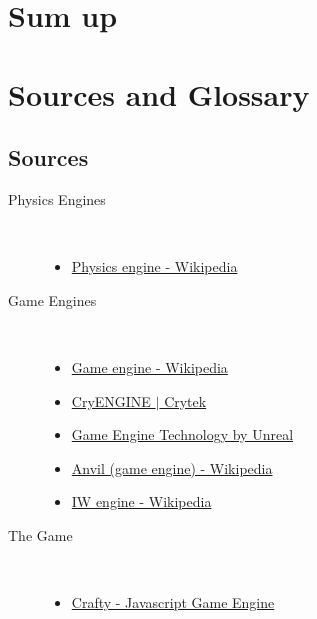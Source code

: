 \documentclass[DIV=calc, paper=a4, fontsize=11pt, twocolumn]{scrreprt}	 %
\begin{document}



        \chapter{Sum up}


        \chapter{Sources and Glossary}

        \section{Sources}
        \begin{description}
          \item[Physics Engines] \hfill \\
            \begin{itemize}
              \item \href{http://en.wikipedia.org/wiki/Physics_engine}{Physics engine - Wikipedia}
            \end{itemize}
          \item[Game Engines] \hfill \\
            \begin{itemize}
              \item \href{http://en.wikipedia.org/wiki/Game_engine}{Game engine - Wikipedia}
              \item \href{http://www.crytek.com/cryengine}{CryENGINE $|$ Crytek}
              \item \href{http://www.unrealengine.com}{Game Engine Technology by Unreal}
              \item \href{http://en.wikipedia.org/wiki/Anvil_(game_engine)}{Anvil (game engine) - Wikipedia}
              \item \href{http://en.wikipedia.org/wiki/IW_engine)}{IW engine - Wikipedia}
            \end{itemize}
          \item[The Game] \hfill \\
            \begin{itemize}
              \item \href{http://craftyjs.com/}{Crafty - Javascript Game Engine}
            \end{itemize}
        \end{description}

        \printglossary%

        
\end{document}
